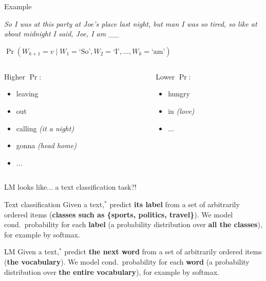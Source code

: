 \documentclass[12pt,aspectratio=169,handout]{beamer}
\begin{document}
\begin{frame}{Example}

\emph{So I was at this party at Joe's place last night, but man I was so tired, so like at about midnight I said, Joe, I am \_\_}

$\Pr(W_{k+1} = v \mid W_1 = \text{`So'}, W_2 = \text{`I'}, \ldots, W_k = \text{`am'})$

\medskip

\begin{columns}[t]
\begin{column}{0.5\linewidth}
Higher $\Pr$:
\begin{itemize}
\item leaving
\item out
\item calling \emph{(it a night)}
\item gonna \emph{(head home)}
\item $\ldots$
\end{itemize}
\end{column}
\begin{column}{0.5\linewidth}
Lower $\Pr$:
\begin{itemize}
\item hungry
\item in \emph{(love)}
\item $\ldots$
\end{itemize}
\end{column}

\end{columns}

\end{frame}



\begin{frame}{LM looks like... a text classification task?!}

\begin{block}{Text classification}
Given a text,$^*$ predict \textbf{its label} from a set of arbitrarily ordered items (\textbf{classes such as \{sports, politics, travel\}}). We model cond.\ probability for each \textbf{label} (a probability distribution over \textbf{all the classes}), for example by softmax.
\end{block}
\pause

\begin{block}{LM}
Given a text,$^*$ predict \textbf{the next word} from a set of arbitrarily ordered items (\textbf{the vocabulary}).
We model cond.\ probability for each \textbf{word} (a probability distribution over \textbf{the entire vocabulary}), for example by softmax.
\end{block}





\end{frame}
\end{document}
